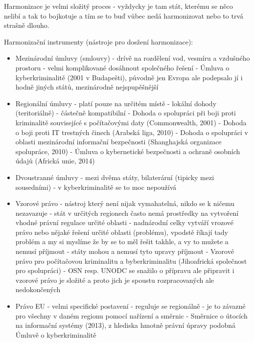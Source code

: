 Harmonizace je velmi složitý proces - vyždycky je tam stát, kterému se něco nelibí a tak to bojkotuje a tím se to buď vůbec nedá harmonizovat nebo to trvá strašně dlouho.

Harmonizační instrumenty (nástroje pro dosžení harmonizace):
\begin{itemize}
    \item Mezinárodní úmluvy (smlouvy) - drívě na rozdělení vod, vesmíru a vzdušného prostoru -
velmi komplikované dosáhnout společného řešení - Úmluva o kyberkriminalitě (2001 v
Budapešti), původně jen Evropa ale podepsalo jí i hodně jiných států, mezinárodně
nejspupěšnější
    \item Regionální úmluvy - platí pouze na určitém místě - lokální dohody (teritoriálně) - částečně
kompatibilní - Dohoda o spolupráci při boji proti kriminalitě souvisejícé s počítačovými daty
(Commonwealth, 2001) - Dohoda o boji proti IT trestných činech (Arabská liga, 2010) -
Dohoda o spolupráci v oblasti mezinárodní informační bezpečnosti (Shanghajská organizace
spolupráce, 2010) - Úmluva o kybernetické bezpečnosti a ochraně osobních údajů (Africká
unie, 2014)
    \item Dvoustranné úmluvy - mezi dvěma státy, bilaterární (tipicky mezi sousedními) - v
kyberkriminalitě se to moc nepoužívá
    \item Vzorové právo - nástroj který není nijak vymahatelná, nikdo se k ničemu nezavazuje - stát v
určitých regionech často nemá prostředky na vytvoření vhodné právní regulace určité oblasti
- nadnárodní celky vytváří vrozové právo nebo nějaké řešení určité oblasti (problému),
vpodstě říkají tady problém a my si myslíme že by se to měl řešit takhle, a vy to mužete a
nemusí příjmout - státy mohou a nemusí tyto upravy příjmout - Vzorové právo pro
počítačovou kriminalitu a byberkriminalitu (Jihoafrická společnost pro spolupráci) - OSN resp.
UNODC se snažilo o přípravu ale připravit i vzorové právo je složité a proto jich je spoustu
rozpracovaných ale nedokončených
    \item Právo EU - velmi specifické postavení - reguluje se regionálně - je to závazné pro všechny v
daném regionu pomocí nařízení a směrnic - Směrnice o útocích na informační systémy
(2013), z hlediska hmotně právní úpravy podobná Úmluvě o kyberkriminalitě
\end{itemize}

